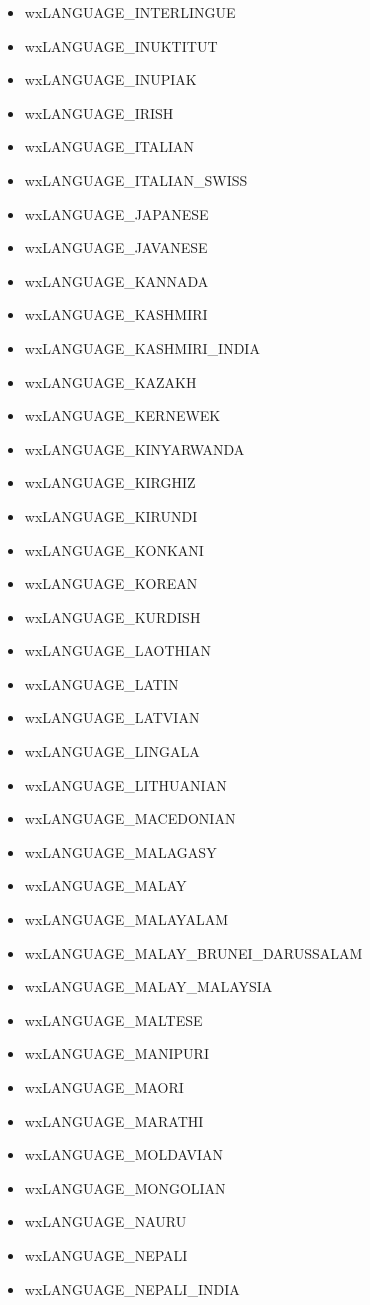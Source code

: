 \begin{itemize}
\item wxLANGUAGE\_INTERLINGUE
\item wxLANGUAGE\_INUKTITUT
\item wxLANGUAGE\_INUPIAK
\item wxLANGUAGE\_IRISH
\item wxLANGUAGE\_ITALIAN
\item wxLANGUAGE\_ITALIAN\_SWISS
\item wxLANGUAGE\_JAPANESE
\item wxLANGUAGE\_JAVANESE
\item wxLANGUAGE\_KANNADA
\item wxLANGUAGE\_KASHMIRI
\item wxLANGUAGE\_KASHMIRI\_INDIA
\item wxLANGUAGE\_KAZAKH
\item wxLANGUAGE\_KERNEWEK
\item wxLANGUAGE\_KINYARWANDA
\item wxLANGUAGE\_KIRGHIZ
\item wxLANGUAGE\_KIRUNDI
\item wxLANGUAGE\_KONKANI
\item wxLANGUAGE\_KOREAN
\item wxLANGUAGE\_KURDISH
\item wxLANGUAGE\_LAOTHIAN
\item wxLANGUAGE\_LATIN
\item wxLANGUAGE\_LATVIAN
\item wxLANGUAGE\_LINGALA
\item wxLANGUAGE\_LITHUANIAN
\item wxLANGUAGE\_MACEDONIAN
\item wxLANGUAGE\_MALAGASY
\item wxLANGUAGE\_MALAY
\item wxLANGUAGE\_MALAYALAM
\item wxLANGUAGE\_MALAY\_BRUNEI\_DARUSSALAM
\item wxLANGUAGE\_MALAY\_MALAYSIA
\item wxLANGUAGE\_MALTESE
\item wxLANGUAGE\_MANIPURI
\item wxLANGUAGE\_MAORI
\item wxLANGUAGE\_MARATHI
\item wxLANGUAGE\_MOLDAVIAN
\item wxLANGUAGE\_MONGOLIAN
\item wxLANGUAGE\_NAURU
\item wxLANGUAGE\_NEPALI
\item wxLANGUAGE\_NEPALI\_INDIA

\end{itemize}
